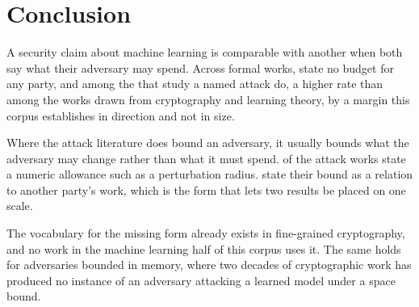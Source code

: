 \section{Conclusion}
\label{sec:conclusion}

A security claim about machine learning is comparable with another when both say
what their adversary may spend. Across \NumSources{} formal works, \NumUnstated{}
state no budget for any party, and among the \NumAttackWorks{} that study a named
attack \AttackUnbound{} do, a higher rate than among the works drawn from
cryptography and learning theory, by a margin this corpus establishes in direction
and not in size.

Where the attack literature does bound an adversary, it usually bounds what the
adversary may change rather than what it must spend. \AttackBudget{} of the
\NumAttackWorks{} attack works state a numeric allowance such as a perturbation
radius. \NumRelativeAttack{} state their bound as a relation to another party's
work, which is the form that lets two results be placed on one scale.

The vocabulary for the missing form already exists in fine-grained cryptography,
and no work in the machine learning half of this corpus uses it. The same holds for
adversaries bounded in memory, where two decades of cryptographic work has produced
no instance of an adversary attacking a learned model under a space bound.
